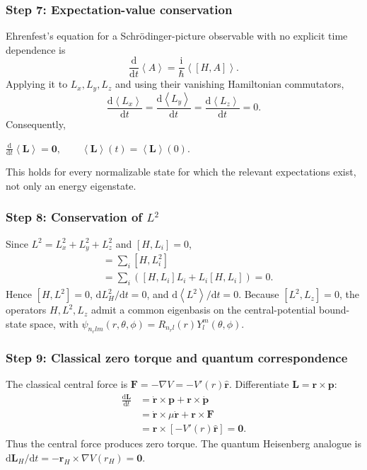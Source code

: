 \documentclass[11pt,a4paper]{article}
\newcommand{\key}[1]{\begin{resultbox}\centering\(\displaystyle #1\)\end{resultbox}}
\newcommand{\dd}{\mathrm{d}}
\newcommand{\iu}{\mathrm{i}}
\newcommand{\avg}[1]{\left\langle #1\right\rangle}
\begin{document}
\subsubsection*{Step 7: Expectation-value conservation}
Ehrenfest's equation for a Schr\"odinger-picture observable with no explicit time dependence is
\begin{equation}\frac{\dd}{\dd t}\avg A=\frac{\iu}{\hbar}\avg{[H,A]}.\end{equation}
Applying it to \(L_x,L_y,L_z\) and using their vanishing Hamiltonian commutators,
\begin{equation}\frac{\dd\avg{L_x}}{\dd t}=\frac{\dd\avg{L_y}}{\dd t}=\frac{\dd\avg{L_z}}{\dd t}=0.\end{equation}
Consequently,
\key{\boxed{\frac{\dd}{\dd t}\avg{\mathbf L}=\mathbf0,\qquad\avg{\mathbf L}(t)=\avg{\mathbf L}(0).}}
This holds for every normalizable state for which the relevant expectations exist, not only an energy eigenstate.

\subsubsection*{Step 8: Conservation of \texorpdfstring{$L^2$}{L squared}}
Since \(L^2=L_x^2+L_y^2+L_z^2\) and \([H,L_i]=0\),
\begin{align}
[H,L^2]&=\sum_i[H,L_i^2]\\
&=\sum_i([H,L_i]L_i+L_i[H,L_i])=0.
\end{align}
Hence \(\boxed{[H,L^2]=0}\), \(\dd L_H^2/\dd t=0\), and \(\dd\avg{L^2}/\dd t=0\). Because \([L^2,L_z]=0\), the operators \(H,L^2,L_z\) admit a common eigenbasis on the central-potential bound-state space, with \(\psi_{n_r l m}(r,\theta,\phi)=R_{n_r l}(r)Y_l^m(\theta,\phi)\).

\subsubsection*{Step 9: Classical zero torque and quantum correspondence}
The classical central force is \(\mathbf F=-\nabla V=-V'(r)\hat{\mathbf r}\). Differentiate \(\mathbf L=\mathbf r\times\mathbf p\):
\begin{align}
\frac{\dd\mathbf L}{\dd t}&=\dot{\mathbf r}\times\mathbf p+\mathbf r\times\dot{\mathbf p}\\
&=\dot{\mathbf r}\times\mu\dot{\mathbf r}+\mathbf r\times\mathbf F\\
&=\mathbf r\times[-V'(r)\hat{\mathbf r}]=\mathbf0.
\end{align}
Thus the central force produces zero torque. The quantum Heisenberg analogue is \(\dd\mathbf L_H/\dd t=-\mathbf r_H\times\nabla V(r_H)=\mathbf0\).
\end{document}
